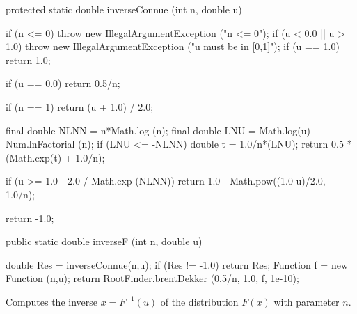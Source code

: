\begin{code}\begin{hide}

   protected static double inverseConnue (int n, double u) {
      if (n <= 0)
         throw new IllegalArgumentException ("n <= 0");
      if (u < 0.0 || u > 1.0)
         throw new IllegalArgumentException ("u must be in [0,1]");
      if (u == 1.0)
         return 1.0;

      if (u == 0.0)
         return 0.5/n;

      if (n == 1)
         return (u + 1.0) / 2.0;

      final double NLNN = n*Math.log (n);
      final double LNU = Math.log(u) - Num.lnFactorial (n);
      if (LNU <= -NLNN){
         double t = 1.0/n*(LNU);
         return 0.5 * (Math.exp(t) + 1.0/n);
      }

      if (u >= 1.0 - 2.0 / Math.exp (NLNN))
         return 1.0 - Math.pow((1.0-u)/2.0, 1.0/n);

      return -1.0;
   }\end{hide}

   public static double inverseF (int n, double u)\begin{hide} {
      double Res = inverseConnue(n,u);
      if (Res != -1.0)
         return Res;
      Function f = new Function (n,u);
      return RootFinder.brentDekker (0.5/n, 1.0, f, 1e-10);
   }\end{hide}
\end{code}
\begin{tabb}
  Computes the inverse $x = F^{-1}(u)$ of the
  \ks{} distribution $F(x)$ with parameter $n$.
\end{tabb}
%
%
